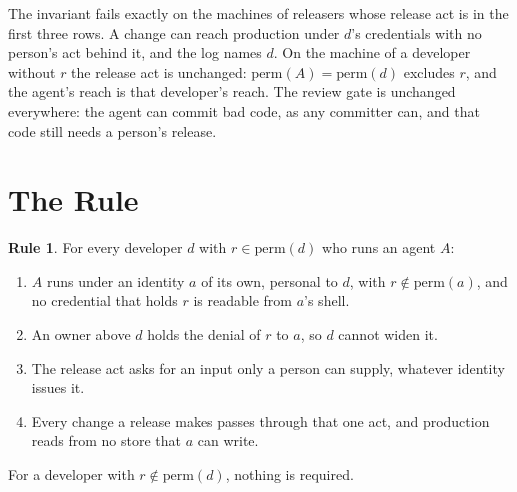 \documentclass[11pt]{article}
\theoremstyle{definition}
\newtheorem*{rulethm}{Rule}
\begin{document}
The invariant fails exactly on the machines of releasers whose release act is in the first three rows. A change can reach production under $d$'s credentials with no person's act behind it, and the log names $d$. On the machine of a developer without $r$ the release act is unchanged: $\mathrm{perm}(A) = \mathrm{perm}(d)$ excludes $r$, and the agent's reach is that developer's reach. The review gate is unchanged everywhere: the agent can commit bad code, as any committer can, and that code still needs a person's release.

\section{The Rule}
\label{sec:rule}

\begin{rulethm}
For every developer $d$ with $r \in \mathrm{perm}(d)$ who runs an agent $A$:
\begin{enumerate}[label=(\alph*)]
\item $A$ runs under an identity $a$ of its own, personal to $d$, with $r \notin \mathrm{perm}(a)$, and no credential that holds $r$ is readable from $a$'s shell.
\item An owner above $d$ holds the denial of $r$ to $a$, so $d$ cannot widen it.
\item The release act asks for an input only a person can supply, whatever identity issues it.
\item Every change a release makes passes through that one act, and production reads from no store that $a$ can write.
\end{enumerate}
For a developer with $r \notin \mathrm{perm}(d)$, nothing is required.
\end{rulethm}
\end{document}
